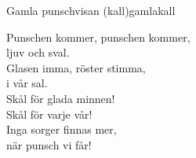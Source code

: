 \begin{song}{Gamla punschvisan (kall)}{gamlakall}
\begin{vers}
Punschen kommer, punschen kommer,\\
ljuv och sval.\\
Glasen imma, röster stimma,\\
i vår sal.\\
Skål för glada minnen!\\
Skål för varje vår!\\
Inga sorger finnas mer,\\
när punsch vi får!\\
\end{vers}
\end{song}
